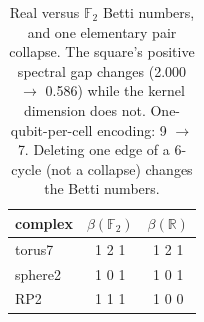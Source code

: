 \begin{table}[h]
\centering\small
\caption{Real versus $\mathbb F_2$ Betti numbers, and one elementary pair collapse. The square's positive spectral gap changes (2.000 $\to$ 0.586) while the kernel dimension does not. One-qubit-per-cell encoding: 9 $\to$ 7. Deleting one edge of a 6-cycle (not a collapse) changes the Betti numbers.}
\label{tab:quantum}
\begin{tabular}{lcc}
\hline
complex & $\beta(\mathbb F_2)$ & $\beta(\mathbb R)$ \\
\hline
torus7 & 1 2 1 & 1 2 1 \\
sphere2 & 1 0 1 & 1 0 1 \\
RP2 & 1 1 1 & 1 0 0 \\
\hline
\end{tabular}
\end{table}
